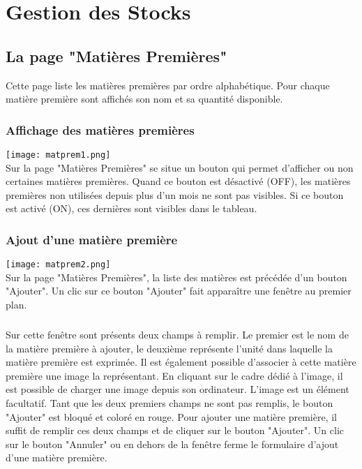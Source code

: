 \chapter{Gestion des Stocks}

\section{La page "Matières Premières"}
Cette page liste les matières premières par ordre alphabétique. Pour chaque
matière première sont affichés son nom et sa quantité disponible.

\subsection{Affichage des matières premières}

\texttt{[image: matprem1.png]}\\

Sur la page "Matières Premières" se situe un bouton qui permet d'afficher ou non
certaines matières premières. Quand ce bouton est désactivé (OFF), les matières
premières non utilisées depuis plus d'un mois ne sont pas visibles. Si ce bouton
 est activé (ON), ces dernières sont visibles dans le tableau.


\subsection{Ajout d'une matière première}
\texttt{[image: matprem2.png]}\\
Sur la page "Matières Premières", la liste des matières est précédée d'un bouton
 "Ajouter".
Un clic sur ce bouton "Ajouter" fait apparaître une fenêtre au premier plan.

\paragraph{}
Sur cette fenêtre sont présents deux champs à remplir. Le premier est le nom de
la matière première à ajouter, le deuxième représente l'unité dans laquelle la
matière première est exprimée. Il est également possible d'associer à cette
matière première une image la représentant. En cliquant sur le cadre dédié à
l'image, il est possible de charger une image depuis son ordinateur. L'image est
un élément facultatif. Tant que les deux premiers champs ne sont pas remplis,
le bouton "Ajouter" est bloqué et coloré en rouge. Pour ajouter une matière
première, il suffit de remplir ces deux champs et de cliquer sur le bouton
"Ajouter". Un clic sur le bouton "Annuler" ou en dehors de la fenêtre ferme
le formulaire d'ajout d'une matière première.


